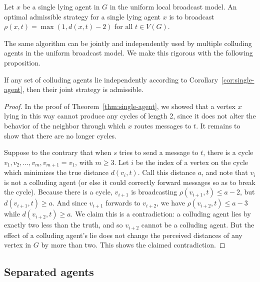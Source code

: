 \documentclass[prodmode,acmec]{ec-acmsmall}
\begin{document}
\begin{corollary} \label{cor:single-agent}

Let $x$ be a single lying agent in $G$ in the uniform local broadcast model. An
optimal admissible strategy for a single lying agent $x$ is to broadcast
$\rho(x,t) = \max(1, d(x,t) - 2)$ for all $t \in V(G)$.

\end{corollary}

The same algorithm can be jointly and independently used by multiple colluding
agents in the uniform broadcast model. We make this rigorous with the following
proposition.

\begin{proposition} \label{prop:independent-agents}

If any set of colluding agents lie independently according to
Corollary~\ref{cor:single-agent}, then their joint strategy is admissible.

\end{proposition}

\begin{proof}

In the proof of Theorem~\ref{thm:single-agent}, we showed that a vertex $x$
lying in this way cannot produce any cycles of length 2, since it does not
alter the behavior of the neighbor through which $x$ routes messages to $t$. It
remains to show that there are no longer cycles.

Suppose to the contrary that when $s$ tries to send a message to $t$, there is
a cycle $v_1, v_2, \dots, v_m, v_{m+1} = v_1$, with $m \geq 3$. Let $i$ be the
index of a vertex on the cycle which minimizes the true distance $d(v_i, t)$.
Call this distance $a$, and note that $v_i$ is not a colluding agent (or else
it could correctly forward messages so as to break the cycle). Because there is
a cycle, $v_{i+1}$ is broadcasting $\rho(v_{i+1}, t) \leq a-2$, but $d(v_{i+1},
t) \geq a$. And since $v_{i+1}$ forwards to $v_{i+2}$, we have $\rho(v_{i+2},
t) \leq a-3$ while $d(v_{i+2}, t) \geq a$. We claim this is a contradiction: a
colluding agent lies by exactly two less than the truth, and so $v_{i+2}$
cannot be a colluding agent. But the effect of a colluding agent's lie does not
change the perceived distances of any vertex in $G$ by more than two. This
shows the claimed contradiction.
\end{proof}

\subsection{Separated agents}\label{sec:separated}
\end{document}
